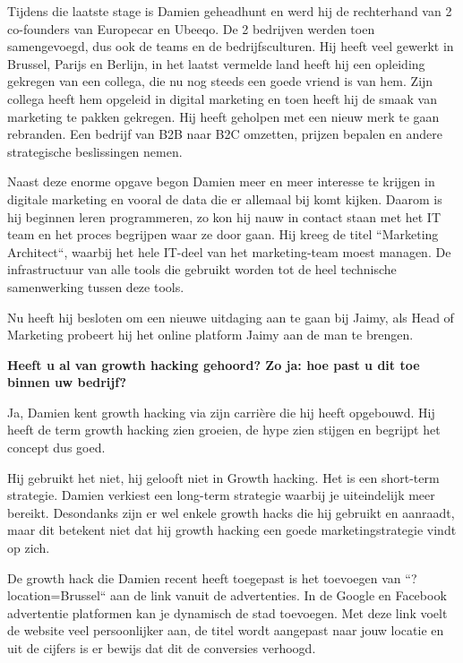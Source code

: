 Tijdens die laatste stage is Damien geheadhunt en werd hij de rechterhand van 2 co-founders van Europecar en Ubeeqo. De 2 bedrijven werden toen samengevoegd, dus ook de teams en de bedrijfsculturen. Hij heeft veel gewerkt in Brussel, Parijs en Berlijn, in het laatst vermelde land heeft hij een opleiding gekregen van een collega, die nu nog steeds een goede vriend is van hem. Zijn collega heeft hem opgeleid in digital marketing en toen heeft hij de smaak van marketing te pakken gekregen. Hij heeft geholpen met een nieuw merk te gaan rebranden. Een bedrijf van B2B naar B2C omzetten, prijzen bepalen en andere strategische beslissingen nemen.

Naast deze enorme opgave begon Damien meer en meer interesse te krijgen in digitale marketing en vooral de data die er allemaal bij komt kijken. Daarom is hij beginnen leren programmeren, zo kon hij nauw in contact staan met het IT team en het proces begrijpen waar ze door gaan. Hij kreeg de titel ``Marketing Architect``, waarbij het hele IT-deel van het marketing-team moest managen. De infrastructuur van alle tools die gebruikt worden tot de heel technische samenwerking tussen deze tools.

Nu heeft hij besloten om een nieuwe uitdaging aan te gaan bij Jaimy, als Head of Marketing probeert hij het online platform Jaimy aan de man te brengen.

\textbf{Heeft u al van growth hacking gehoord? Zo ja: hoe past u dit toe binnen uw bedrijf?}
	
Ja, Damien kent growth hacking via zijn carrière die hij heeft opgebouwd. Hij heeft de term growth hacking zien groeien, de hype zien stijgen en begrijpt het concept dus goed.

Hij gebruikt het niet, hij gelooft niet in Growth hacking. Het is een short-term strategie. Damien verkiest een long-term strategie waarbij je uiteindelijk meer bereikt. Desondanks zijn er wel enkele growth hacks die hij gebruikt en aanraadt, maar dit betekent niet dat hij growth hacking een goede marketingstrategie vindt op zich. 

De growth hack die Damien recent heeft toegepast is het toevoegen van ``?location=Brussel`` aan de link vanuit de advertenties. In de Google en Facebook advertentie platformen kan je dynamisch de stad toevoegen. Met deze link voelt de website veel persoonlijker aan, de titel wordt aangepast naar jouw locatie en uit de cijfers is er bewijs dat dit de conversies verhoogd.

